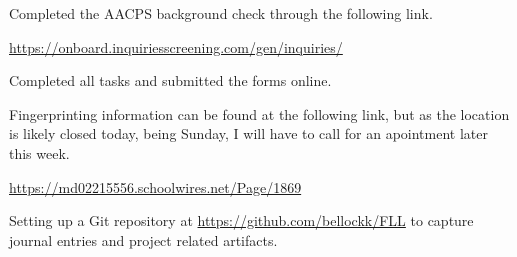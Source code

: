 
Completed the AACPS background check through the following link.

\url{https://onboard.inquiriesscreening.com/gen/inquiries/}

Completed all tasks and submitted the forms online.

Fingerprinting information can be found at the following link, but as the location is likely closed today, being Sunday, I will have to call for an apointment later this week.

\url{https://md02215556.schoolwires.net/Page/1869}

Setting up a Git repository at \url{https://github.com/bellockk/FLL} to capture journal entries and project related artifacts.
